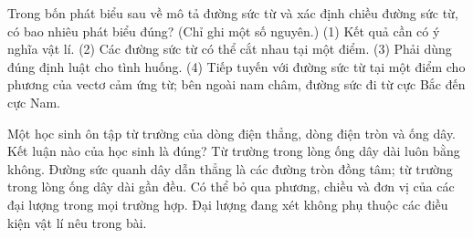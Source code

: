 \begin{ex}
Trong bốn phát biểu sau về mô tả đường sức từ và xác định chiều đường sức từ, có bao nhiêu phát biểu đúng? (Chỉ ghi một số nguyên.) (1) Kết quả cần có ý nghĩa vật lí. (2) Các đường sức từ có thể cắt nhau tại một điểm. (3) Phải dùng đúng định luật cho tình huống. (4) Tiếp tuyến với đường sức từ tại một điểm cho phương của vectơ cảm ứng từ; bên ngoài nam châm, đường sức đi từ cực Bắc đến cực Nam.
\end{ex}

\begin{ex}
Một học sinh ôn tập từ trường của dòng điện thẳng, dòng điện tròn và ống dây. Kết luận nào của học sinh là đúng?
\choice
{Từ trường trong lòng ống dây dài luôn bằng không.}
{\True Đường sức quanh dây dẫn thẳng là các đường tròn đồng tâm; từ trường trong lòng ống dây dài gần đều.}
{Có thể bỏ qua phương, chiều và đơn vị của các đại lượng trong mọi trường hợp.}
{Đại lượng đang xét không phụ thuộc các điều kiện vật lí nêu trong bài.}
\end{ex}

